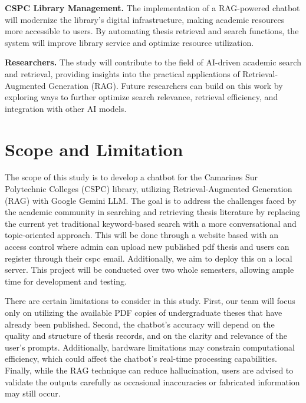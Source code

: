 \begin{refsection}
\bigbreak
\noindent \textbf{CSPC Library Management.} The implementation of a RAG-powered chatbot will modernize the library’s digital infrastructure, making academic resources more accessible to users. By automating thesis retrieval and search functions, the system will improve library service and optimize resource utilization.

\bigbreak
\noindent \textbf{Researchers.} The study will contribute to the field of AI-driven academic search and retrieval, providing insights into the practical applications of Retrieval-Augmented Generation (RAG). Future researchers can build on this work by exploring ways to further optimize search relevance, retrieval efficiency, and integration with other AI models.

\newpage
\clearpage
\section{Scope and Limitation}

\hspace{1cm}The scope of this study is to develop a chatbot for the Camarines Sur Polytechnic Colleges (CSPC) library, utilizing Retrieval-Augmented Generation (RAG) with Google Gemini LLM. The goal is to address the challenges faced by the academic community in searching and retrieving thesis literature by replacing the current yet traditional keyword-based search with a more conversational and topic-oriented approach. This will be done through a website based with an access control where admin can upload new published pdf thesis and users can register through their cspc email. Additionally, we aim to deploy this on a local server. This project will be conducted over two whole semesters, allowing ample time for development and testing.

\bigbreak
\hspace{0.4cm}There are certain limitations to consider in this study. First, our team will focus only on utilizing the available PDF copies of undergraduate theses that have already been published. Second, the chatbot’s accuracy will depend on the quality and structure of thesis records, and on the clarity and relevance of the user's prompts. Additionally, hardware limitations may constrain computational efficiency, which could affect the chatbot’s real-time processing capabilities. Finally, while the RAG technique can reduce hallucination, users are advised to validate the outputs carefully as occasional inaccuracies or fabricated information may still occur. 


\end{refsection}
